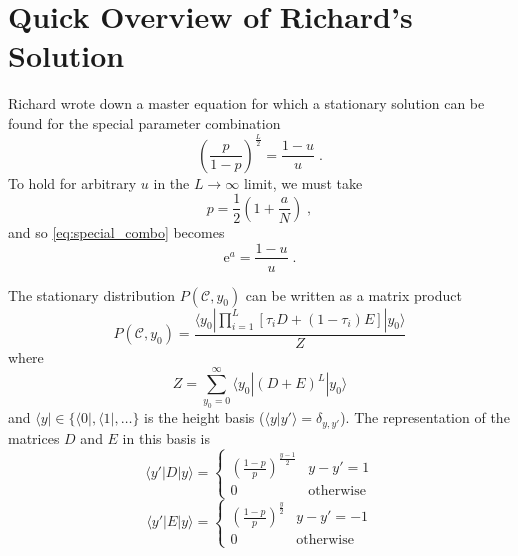 \documentclass[a4paper,10pt]{article}
\newcommand{\bra}[1]{\langle #1 |}
\newcommand{\ket}[1]{| #1 \rangle}
\newcommand{\braket}[2]{\langle #1 | #2 \rangle}
\begin{document}
\section{Quick Overview of Richard's Solution}

Richard wrote down a master equation for which a stationary solution can be found for the special parameter combination
\begin{equation}\label{eq:special_combo}
 \left( \frac{p}{1-p} \right)^{\frac{L}{2}} = \frac{1-u}{u} \;.
\end{equation}
To hold for arbitrary $u$ in the $L\to\infty$ limit, we must take
\begin{equation}\label{eq:p-a}
 p = \frac{1}{2} \left( 1 + \frac{a}{N} \right) \;, 
\end{equation}
and so \eqref{eq:special_combo} becomes
\begin{equation}\label{eq:a-u}
 \mathrm{e}^a = \frac{1-u}{u} \;.
\end{equation}

The stationary distribution $P(\mathcal{C},y_0)$ can be written as a matrix product
\begin{equation}
 P(\mathcal{C},y_0) = \frac{
 					\bra{y_0} \prod_{i=1}^L [\tau_i D + (1-\tau_i)E] \ket{y_0}
                                           }
                                           {
                                            Z
                                           }
\end{equation}
where 
\begin{equation}
 Z = \sum_{y_0=0}^\infty \bra{y_0} (D+E)^L \ket{y_0}
\end{equation}
and $\bra{y} \in \{ \bra{0}, \bra{1}, \ldots \}$ is the height basis ($\braket{y}{y'} = \delta_{y,y'}$). 
The representation of the matrices $D$ and $E$ in this basis is
\begin{equation}
 \bra{y'}D\ket{y} = \begin{cases}
                              \left( \frac{ 1-p}{p} \right)^{\frac{y-1}{2}} & y-y'=1 \\
                              0 & \mbox{otherwise} 
                             \end{cases}
\end{equation}
\begin{equation}
 \bra{y'}E\ket{y} = \begin{cases}
                              \left( \frac{ 1-p}{p} \right)^{\frac{y}{2}} & y-y'=-1 \\
                              0 & \mbox{otherwise} 
                             \end{cases}
\end{equation}                         
\end{document}
